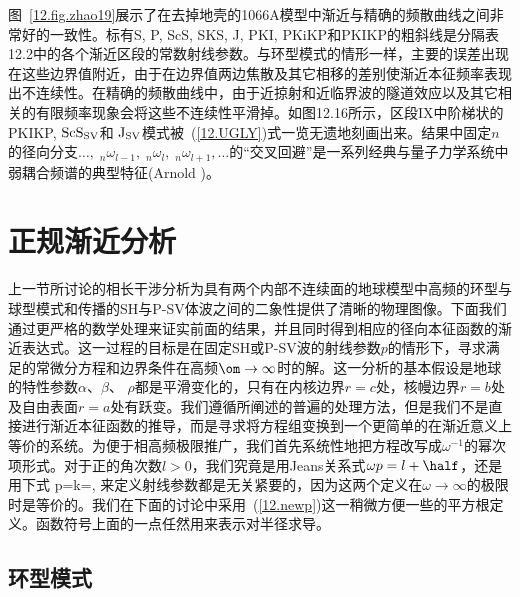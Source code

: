 图~\ref{12.fig.zhao19}展示了在去掉地壳的1066A模型中渐近与精确的频散曲线之间非常好的一致性。标有S, P, ScS, SKS, J, PKI, PKiKP和PKIKP的粗斜线是分隔表12.2中的各个渐近区段的常数射线参数。与环型模式的情形一样，主要的误差出现在这些边界值附近，由于在边界值两边焦散及其它相移的差别使渐近本征频率表现出不连续性。在精确的频散曲线中，由于近掠射和近临界波的隧道效应以及其它相关的有限频率现象会将这些不连续性平滑掉。如图12.16所示，区段IX中阶梯状的PKIKP, ${\rm ScS}_{\rm SV}$和
${\rm J}_{\rm SV}$模式被~(\ref{12.UGLY})式一览无遗地刻画出来。结果中固定$n$的径向分支$\ldots,\;{}_n\omega_{l-1},\; {}_n\omega_l,
\;{}_n\omega_{l+1},\dots$的“交叉回避”是一系列经典与量子力学系统中弱耦合频谱的典型特征(Arnold \citeyear{arnold78})。
%
%

\section{正规渐近分析}
\label{12.sec.JWKBS}

上一节所讨论的相长干涉分析为具有两个内部不连续面的地球模型中高频的环型与球型模式和传播的SH与P-SV体波之间的二象性提供了清晰的物理图像。下面我们通过更严格的数学处理来证实前面的结果，并且同时得到相应的径向本征函数的渐近表达式。这一过程的目标是在固定SH或P-SV波的射线参数$p$的情形下，寻求满足的常微分方程和边界条件在高频$\om\rightarrow\infty$时的解。这一分析的基本假设是地球的特性参数$\alpha$、$\beta$、
$\rho$都是平滑变化的，只有在内核边界$r=c$处，核幔边界$r=b$处及自由表面$r=a$处有跃变。我们遵循\textcite{woodhouse78}所阐述的普遍的处理方法，但是我们不是直接进行渐近本征函数的推导，而是寻求将方程组变换到一个更简单的在渐近意义上等价的系统。为便于相高频极限推广，我们首先系统性地把方程改写成$\omega^{-1}$的幂次项形式。对于正的角次数$l>0$，我们究竟是用Jeans关系式$\omega p=l+\half$，还是用下式
\eq \label{12.newp}
\omega p=k=,
\en
来定义射线参数都是无关紧要的，因为这两个定义在$\omega\rightarrow\infty$的极限时是等价的。我们在下面的讨论中采用~(\ref{12.newp})这一稍微方便一些的平方根定义。函数符号上面的一点任然用来表示对半径求导。

\subsection{环型模式}
%
\label{12.sec.torasy}

